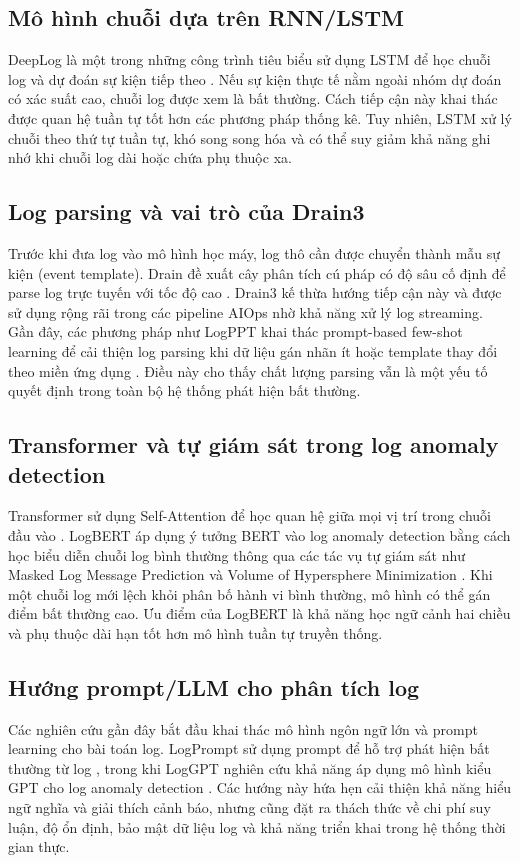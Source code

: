 \documentclass[conference]{IEEEtran}
\begin{document}
\subsection{Mô hình chuỗi dựa trên RNN/LSTM}
DeepLog là một trong những công trình tiêu biểu sử dụng LSTM để học chuỗi log và dự đoán sự kiện tiếp theo \cite{b1}. Nếu sự kiện thực tế nằm ngoài nhóm dự đoán có xác suất cao, chuỗi log được xem là bất thường. Cách tiếp cận này khai thác được quan hệ tuần tự tốt hơn các phương pháp thống kê. Tuy nhiên, LSTM xử lý chuỗi theo thứ tự tuần tự, khó song song hóa và có thể suy giảm khả năng ghi nhớ khi chuỗi log dài hoặc chứa phụ thuộc xa.

\subsection{Log parsing và vai trò của Drain3}
Trước khi đưa log vào mô hình học máy, log thô cần được chuyển thành mẫu sự kiện (event template). Drain đề xuất cây phân tích cú pháp có độ sâu cố định để parse log trực tuyến với tốc độ cao \cite{b3}. Drain3 kế thừa hướng tiếp cận này và được sử dụng rộng rãi trong các pipeline AIOps nhờ khả năng xử lý log streaming. Gần đây, các phương pháp như LogPPT khai thác prompt-based few-shot learning để cải thiện log parsing khi dữ liệu gán nhãn ít hoặc template thay đổi theo miền ứng dụng \cite{b7}. Điều này cho thấy chất lượng parsing vẫn là một yếu tố quyết định trong toàn bộ hệ thống phát hiện bất thường.

\subsection{Transformer và tự giám sát trong log anomaly detection}
Transformer sử dụng Self-Attention để học quan hệ giữa mọi vị trí trong chuỗi đầu vào \cite{b4}. LogBERT áp dụng ý tưởng BERT vào log anomaly detection bằng cách học biểu diễn chuỗi log bình thường thông qua các tác vụ tự giám sát như Masked Log Message Prediction và Volume of Hypersphere Minimization \cite{b2}. Khi một chuỗi log mới lệch khỏi phân bố hành vi bình thường, mô hình có thể gán điểm bất thường cao. Ưu điểm của LogBERT là khả năng học ngữ cảnh hai chiều và phụ thuộc dài hạn tốt hơn mô hình tuần tự truyền thống.

\subsection{Hướng prompt/LLM cho phân tích log}
Các nghiên cứu gần đây bắt đầu khai thác mô hình ngôn ngữ lớn và prompt learning cho bài toán log. LogPrompt sử dụng prompt để hỗ trợ phát hiện bất thường từ log \cite{b8}, trong khi LogGPT nghiên cứu khả năng áp dụng mô hình kiểu GPT cho log anomaly detection \cite{b9}. Các hướng này hứa hẹn cải thiện khả năng hiểu ngữ nghĩa và giải thích cảnh báo, nhưng cũng đặt ra thách thức về chi phí suy luận, độ ổn định, bảo mật dữ liệu log và khả năng triển khai trong hệ thống thời gian thực.
\end{document}
